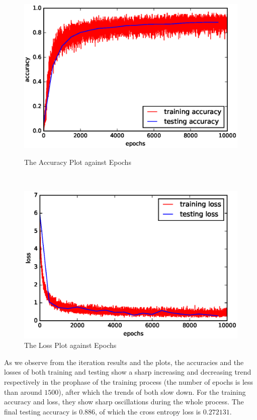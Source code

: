 \documentclass[10pt]{article}
\begin{document}
\begin{figure}[H]
\centering
\begin{minipage}[b]{0.45\textwidth}
\centering
\includegraphics[scale=.5]{plot1.eps}
\caption{The Accuracy Plot against Epochs}
\label{plot1}
\end{minipage}
\
\begin{minipage}[b]{0.45\textwidth}
\centering
\includegraphics[scale=.5]{plot2.eps}
\caption{The Loss Plot against Epochs}
\label{plot2}
\end{minipage}
\end{figure}
As we observe from the iteration results and the plots, the accuracies and the losses of both training and testing show a sharp increasing and decreasing trend respectively in the prophase of the training process (the number of epochs is less than around $1500$), after which the trends of both slow down. For the training accuracy and loss, they show sharp oscillations during the whole process. The final testing accuracy is $0.886$, of which the cross entropy loss is $0.272131$.
\end{document}
